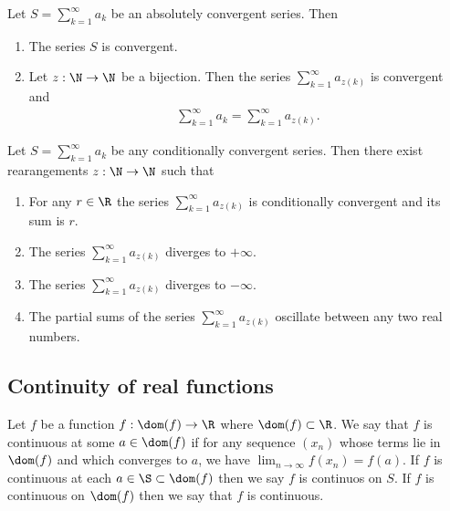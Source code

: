 \documentclass{article}
\begin{document}
\begin{theorem}[Notes 1.8]
    Let $S=\sum_{k=1}^\infty a_k$ be an absolutely convergent series. Then
    \begin{enumerate}
        \item The series $S$ is convergent.
        \item Let $z:\N\to\N$ be a bijection. Then the series $\sum_{k=1}^\infty a_{z(k)}$
            is convergent and \begin{align*}
                \sum_{k=1}^\infty a_k = \sum_{k=1}^\infty a_{z(k)}.
            \end{align*}
    \end{enumerate} 
\end{theorem}

\begin{theorem}[Notes 1.9]
    Let $S=\sum_{k=1}^\infty a_k$ be any conditionally convergent series. Then there
    exist rearangements $z:\N\to\N$ such that
    \begin{enumerate}
        \item For any $r\in\R$ the series $\sum_{k=1}^\infty a_{z(k)}$ is conditionally
            convergent and its sum is $r$.
        \item The series $\sum_{k=1}^\infty a_{z(k)}$ diverges to $+\infty$.
        \item The series $\sum_{k=1}^\infty a_{z(k)}$ diverges to $-\infty$.
        \item The partial sums of the series $\sum_{k=1}^\infty a_{z(k)}$ oscillate between any two real numbers.
    \end{enumerate} 
\end{theorem}

\subsection{Continuity of real functions}

\begin{definition}[Notes 1.7]
    Let $f$ be a function $f:\dom(f)\to\R$ where $\dom(f)\subset\R$. We say that $f$ is
    continuous at some $a\in\dom(f)$ if for any sequence $(x_n)$ whose terms lie in
    $\dom(f)$ and which converges to $a$, we have $\lim_{n\to\infty}f(x_n)=f(a)$. If 
    $f$ is continuous at each $a\in\S\subset\dom(f)$ then we say $f$ is continuos on $S$.
    If $f$ is continuous on $\dom(f)$ then we say that $f$ is continuous.
\end{definition}
\end{document}

